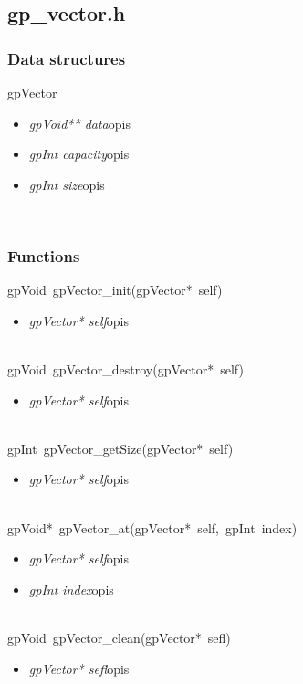 \subsection{gp_vector.h}
\subsubsection{Data structures}
\textsf{gpVector}
	\begin{itemize}
		\item \textit{gpVoid** data}\quad opis
		\item \textit{gpInt capacity}\quad opis
		\item \textit{gpInt size}\quad opis
	\end{itemize}
\ \\
\subsubsection{Functions}
\mbox{\textsf{gpVoid gpVector_init(gpVector* self)}}
	\begin{itemize}
		\item \textit{gpVector* self}\quad opis
	\end{itemize}

 \ \\
\mbox{\textsf{gpVoid gpVector_destroy(gpVector* self)}}
	\begin{itemize}
		\item \textit{gpVector* self}\quad opis
	\end{itemize}

 \ \\
\mbox{\textsf{gpInt gpVector_getSize(gpVector* self)}}
	\begin{itemize}
		\item \textit{gpVector* self}\quad opis
	\end{itemize}

 \ \\
\mbox{\textsf{gpVoid* gpVector_at(gpVector* self, gpInt index)}}
	\begin{itemize}
		\item \textit{gpVector* self}\quad opis
		\item \textit{gpInt index}\quad opis
	\end{itemize}

 \ \\
\mbox{\textsf{gpVoid gpVector_clean(gpVector* sefl)}}
	\begin{itemize}
		\item \textit{gpVector* sefl}\quad opis
	\end{itemize}

